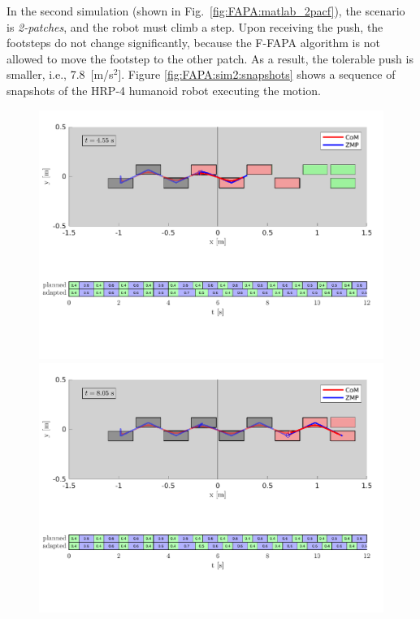In the second simulation (shown in Fig.~\ref{fig:FAPA:matlab_2pacf}),
the scenario is {\em 2-patches}, and the robot must climb a step.
Upon receiving the push, the footsteps do not change significantly,
because the F-FAPA algorithm is not allowed to move the footstep to the other
patch. As a result, the tolerable push is smaller, i.e., 7.8~[m/s$^2]$.
Figure \ref{fig:FAPA:sim2:snapshots} shows a sequence of snapshots of the
HRP-4 humanoid robot executing the motion.
\begin{figure}
    \centering
    \includegraphics[trim={0 5.9cm 0 0.7cm},clip,width=\textwidth]{figures/two-patches-fixed-plot-after-push.pdf}
    \includegraphics[trim={0 5.9cm 0 0.7cm},clip,width=\textwidth]{figures/two-patches-fixed-completing-task.pdf}

\end{figure}
